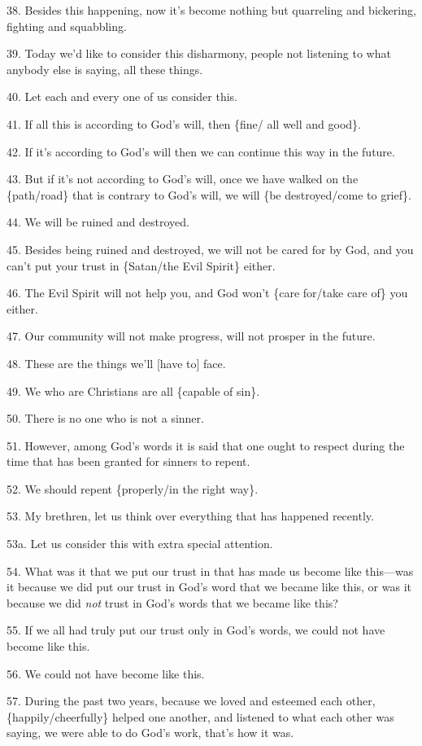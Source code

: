 38. Besides this happening, now it's become nothing but quarreling and bickering,
fighting and squabbling.

39. Today we'd like to consider this disharmony, people not listening to what anybody
else is saying, all these things.

40. Let each and every one of us consider this.

41. If all this is according to God's will, then \{fine/ all well and good\}.

42. If it's according to God's will then we can continue this way in the future.

43. But if it's not according to God's will, once we have walked on the \{path/road\}
that is contrary to God's will, we will \{be destroyed/come to grief\}.

44. We will be ruined and destroyed.

45. Besides being ruined and destroyed, we will not be cared for by God, and you
can't put your trust in \{Satan/the Evil Spirit\} either.

46. The Evil Spirit will not help you, and God won't \{care for/take care of\}
you either.

47. Our community will not make progress, will not prosper in the future.

48. These are the things we'll [have to] face.

49. We who are Christians are all \{capable of sin\}.

50. There is no one who is not a sinner.

51. However, among God's words it is said that one ought to respect during the
time that has been granted for sinners to repent.

52. We should repent \{properly/in the right way\}.

53. My brethren, let us think over everything that has happened recently.

53a. Let us consider this with extra special attention.

54. What was it that we put our trust in that has made us become like this---was
it because we did put our trust in God's word that we became like this, or was
it because we did \textit{not} trust in God's words that we became like this?

55. If we all had truly put our trust only in God's words, we could not have become
like this.

56. We could not have become like this.

57. During the past two years, because we loved and esteemed each other, \{happily/cheerfully\}
helped one another, and listened to what each other was saying, we were able to
do God's work, that's how it was.

